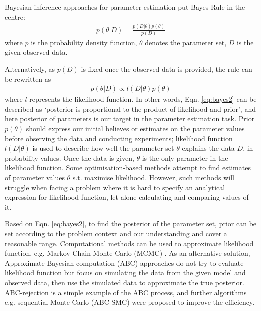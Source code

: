 



Bayesian inference approaches for parameter estimation put Bayes Rule in the centre:
\begin{align}
   \label{eq:bayes}
   p(\theta|D) = \frac{p(D|\theta)p(\theta)}{p(D)}
\end{align}
where $p$ is the probability density function, $\theta$ denotes the parameter set, $D$ is the given observed data.

Alternatively, as $p(D)$ is fixed once the observed data is provided, the rule can be rewritten as 
\begin{align}
   \label{eq:bayes2}
   p(\theta|D) \propto l(D|\theta)p(\theta)
\end{align}
where $l$ represents the likelihood function. In other words, Eqn. \ref{eq:bayes2} can be described as `posterior is proportional to the product of likelihood and prior', and here posterior of parameters is our target in the parameter estimation task. Prior $p(\theta)$ should express our initial believes or estimates on the parameter values before observing the data and conducting experiments; likelihood function $l(D|\theta)$ is used to describe how well the parameter set $\theta$ explains the data $D$, in probability values. Once the data is given, $\theta$ is the only parameter in the likelihood function. Some optimisation-based methods attempt to find estimates of parameter values $\theta$ s.t. maximise likelihood. However, such methods will struggle when facing a problem where it is hard to specify an analytical expression for likelihood function, let alone calculating and comparing values of it.

Based on Eqn. \ref{eq:bayes2}, to find the posterior of the parameter set, prior can be set according to the problem context and our understanding and cover a reasonable range. Computational methods can be used to approximate likelihood function, e.g. Markov Chain Monte Carlo (MCMC) \cite{ref:MCMC}. As an alternative solution, Approximate Bayesian computation (ABC) approaches do not try to evaluate likelihood function but focus on simulating the data from the given model and observed data, then use the simulated data to approximate the true posterior. ABC-rejection \cite{ABC_rejection} is a simple example of the ABC process, and further algorithms e.g. sequential Monte-Carlo (ABC SMC) \cite{Toni} were proposed to improve the efficiency.

